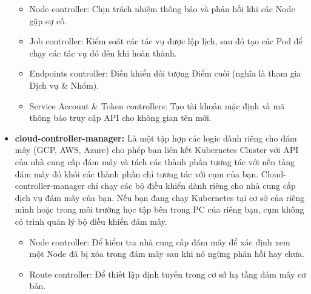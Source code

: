 \documentclass[12pt,a4paper]{report}
\begin{document}
\begin{itemize}
	\hspace{0.8cm}{Một số loại bộ điều khiển có thể kể đến:}
	\begin{itemize}
		\item Node controller: Chịu trách nhiệm thông báo và phản hồi khi các Node gặp sự cố.
		
		\item Job controller: Kiểm soát các tác vụ được lập lịch, sau đó tạo các Pod để chạy các tác vụ đó đến khi hoàn thành.
		
		\item Endpoints controller: Điền khiển đối tượng Điểm cuối (nghĩa là tham gia Dịch vụ \& Nhóm).
		
		\item Service Account \& Token controllers: Tạo tài khoản mặc định và mã thông báo truy cập API cho không gian tên mới.
	\end{itemize}

	\item \textbf{cloud-controller-manager:}
	\subitem
	Là một tập hợp các logic dành riêng cho đám mây (GCP, AWS, Azure) cho phép bạn liên kết Kubernetes Cluster với API của nhà cung cấp đám mây và tách các thành phần tương tác với nền tảng đám mây đó khỏi các thành phần chỉ tương tác với cụm của bạn. Cloud-controller-manager chỉ chạy các bộ điều khiển dành riêng cho nhà cung cấp dịch vụ đám mây của bạn. Nếu bạn đang chạy Kubernetes tại cơ sở của riêng mình hoặc trong môi trường học tập bên trong PC của riêng bạn, cụm không có trình quản lý bộ điều khiển đám mây.
	
	\hspace{0.8cm}{Cũng như với kube-controller-manager, cloud-controller-manager kết hợp một số vòng điều khiển độc lập về mặt logic thành một tệp nhị phân duy nhất mà bạn chạy như một quy trình duy nhất. Bạn có thể chia tỷ lệ theo chiều ngang (chạy nhiều hơn một bản sao) để cải thiện hiệu suất hoặc để giúp tăng khả năng chịu lỗi. }
	
	\hspace{0.8cm}{Các bộ điều khiển sau có thể có các phần phụ thuộc của nhà cung cấp dịch vụ đám mây:}
	\begin{itemize}
	\item Node controller: Để kiểm tra nhà cung cấp đám mây để xác định xem một Node đã bị xóa trong đám mây sau khi nó ngừng phản hồi hay chưa.
	
	\item Route controller: Để thiết lập định tuyến trong cơ sở hạ tầng đám mây cơ bản.
	

\end{itemize}
\end{itemize}
\end{document}
